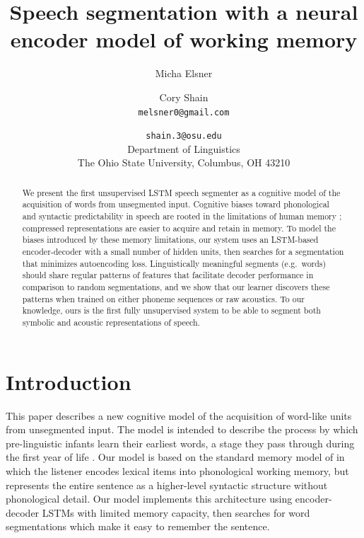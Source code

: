 \documentclass[11pt,letterpaper]{article}
\title{Speech segmentation with a neural encoder model of working memory}
\author{Micha Elsner \and Cory Shain \\
        \texttt{melsner0@gmail.com} \and \texttt{shain.3@osu.edu} \\
        Department of Linguistics \\ The Ohio State University,
        Columbus, OH 43210}
\date{}
\begin{document}
\maketitle

\begin{abstract}
We present the first unsupervised LSTM speech segmenter as a cognitive model of the acquisition of words from unsegmented input.
Cognitive biases toward phonological and syntactic predictability in speech are rooted in the limitations of human memory \cite{Baddeley98};
compressed representations are easier to acquire and retain in memory.
To model the biases introduced by these memory limitations, our system uses an LSTM-based encoder-decoder with a small number of hidden units,
then searches for a segmentation that minimizes autoencoding loss.
Linguistically meaningful segments (e.g.\ words) should share regular patterns of features that facilitate decoder performance in comparison to random segmentations,
and we show that our learner discovers these patterns when trained on either phoneme sequences or raw acoustics.
To our knowledge, ours is the first fully unsupervised system to be able to segment both symbolic and acoustic representations of speech.
\end{abstract}


\section{Introduction}

This paper describes a new cognitive model of the acquisition of
word-like units from unsegmented input. The model is intended to
describe the process by which pre-linguistic infants learn their
earliest words, a stage they pass through during the first year of
life \cite{Jusczyk95,Bergelson12}. Our model is based on the standard
memory model of  in which the listener encodes
lexical items into phonological working memory, but represents the
entire sentence as a higher-level syntactic structure without
phonological detail. Our model implements this architecture using
encoder-decoder LSTMs with limited memory capacity, then searches for
word segmentations which make it easy to remember the sentence.
\end{document}
